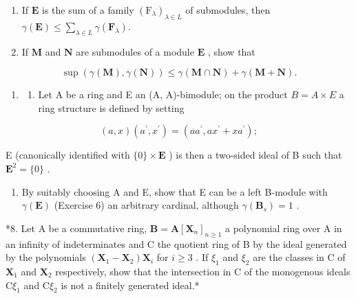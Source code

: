 \begin{enumerate}
\def\labelenumi{(\alph{enumi})}
\setcounter{enumi}{1}
\item
  If \(\mathbf{E}\) is the sum of a family \((\mathrm{F}_{\lambda})_{\lambda \in L}\) of submodules, then \(\gamma (\mathbf{E})\leqslant \sum_{\lambda \in L}\gamma (\mathbf{F}_{\lambda}).\)
\item
  If \(\mathbf{M}\) and \(\mathbf{N}\) are submodules of a module \(\mathbf{E}\) , show that
\end{enumerate}

\[
\sup (\gamma (\mathbf {M}), \gamma (\mathbf {N})) \leqslant \gamma (\mathbf {M} \cap \mathbf {N}) + \gamma (\mathbf {M} + \mathbf {N}).
\]

\begin{enumerate}
\def\labelenumi{\arabic{enumi}.}
\setcounter{enumi}{6}
\tightlist
\item
  \begin{enumerate}
  \def\labelenumii{(\alph{enumii})}
  \tightlist
  \item
    Let A be a ring and E an (A, A)-bimodule; on the product \(B = A \times E\) a ring structure is defined by setting
  \end{enumerate}
\end{enumerate}

\[
(a, x) (a ^ {\prime}, x ^ {\prime}) = (a a ^ {\prime}, a x ^ {\prime} + x a ^ {\prime});
\]

E (canonically identified with \(\{0\} \times \mathbf{E}\) ) is then a two-sided ideal of B such that \(\mathbf{E}^2 = \{0\}\) .

\begin{enumerate}
\def\labelenumi{(\alph{enumi})}
\setcounter{enumi}{1}
\tightlist
\item
  By suitably choosing A and E, show that E can be a left B-module with \(\gamma(\mathbf{E})\) (Exercise 6) an arbitrary cardinal, although \(\gamma(\mathbf{B}_{s}) = 1\) .
\end{enumerate}

*8. Let A be a commutative ring, \(\mathbf{B} = \mathbf{A}[\mathbf{X}_n]_{n\geqslant 1}\) a polynomial ring over A in an infinity of indeterminates and C the quotient ring of B by the ideal generated by the polynomials \((\mathbf{X}_1 - \mathbf{X}_2)\mathbf{X}_i\) for \(i\geqslant 3\) . If \(\xi_1\) and \(\xi_2\) are the classes in C of \(\mathbf{X}_1\) and \(\mathbf{X}_2\) respectively, show that the intersection in C of the monogenous ideals \(\mathrm{C}\xi_1\) and \(\mathrm{C}\xi_2\) is not a finitely generated ideal.*

